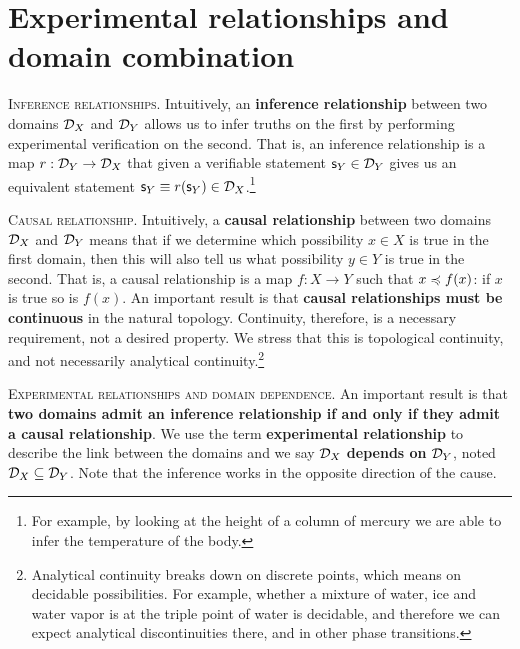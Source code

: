 \documentclass[10pt,twocolumn, nofootinbib]{revtex4-2}
\newcommand\partitle[1]{\textsc{#1}.}
\begin{document}
\section{Experimental relationships and domain combination}

\partitle{Inference relationships} Intuitively, an \textbf{ inference relationship} between two domains $\mathcal{D}_X$ and $\mathcal{D}_Y$ allows us to infer truths on the first by performing experimental verification on the second. That is, an inference relationship is a map $r : \mathcal{D}_Y \to \mathcal{D}_X$ that given a verifiable statement $\mathsf{s}_Y \in \mathcal{D}_Y$ gives us an equivalent statement $\mathsf{s}_Y \equiv r(\mathsf{s}_Y) \in \mathcal{D}_X$.\footnote{For example, by looking at the height of a column of mercury we are able to infer the temperature of the body.}

\partitle{Causal relationship} Intuitively, a \textbf{causal relationship} between two domains $\mathcal{D}_X$ and $\mathcal{D}_Y$ means that if we determine which possibility $x \in X$ is true in the first domain, then this will also tell us what possibility $y \in Y$ is true in the second. That is, a causal relationship is a map $f : X \to Y$ such that $x \preccurlyeq f(x)$: if $x$ is true so is $f(x)$. An important result is that \textbf{causal relationships must be continuous} in the natural topology. Continuity, therefore, is a necessary requirement, not a desired property. We stress that this is topological continuity, and not necessarily analytical continuity.\footnote{Analytical continuity breaks down on discrete points, which means on decidable possibilities. For example, whether a mixture of water, ice and water vapor is at the triple point of water is decidable, and therefore we can expect analytical discontinuities there, and in other phase transitions.}

\partitle{Experimental relationships and domain dependence} An important result is that \textbf{two domains admit an inference relationship if and only if they admit a causal relationship}. We use the term \textbf{experimental relationship} to describe the link between the domains and we say $\mathcal{D}_X$ \textbf{depends on} $\mathcal{D}_Y$, noted $\mathcal{D}_X \subseteq \mathcal{D}_Y$. Note that the inference works in the opposite direction of the cause.
\end{document}
